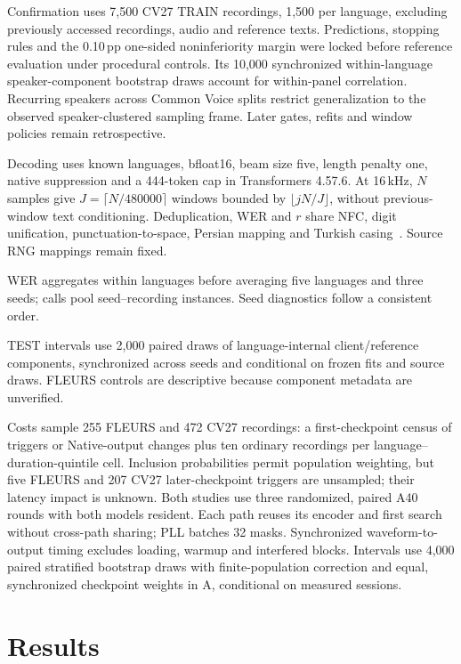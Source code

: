 \documentclass[conference,letterpaper]{IEEEtran}
\begin{document}
Confirmation uses 7,500 CV27 TRAIN recordings, 1,500 per language, excluding previously accessed recordings, audio and reference texts. Predictions, stopping rules and the 0.10\,pp one-sided noninferiority margin were locked before reference evaluation under procedural controls. Its 10,000 synchronized within-language speaker-component bootstrap draws account for within-panel correlation. Recurring speakers across Common Voice splits restrict generalization to the observed speaker-clustered sampling frame. Later gates, refits and window policies remain retrospective.

Decoding uses known languages, bfloat16, beam size five, length penalty one, native suppression and a 444-token cap in Transformers 4.57.6. At 16\,kHz, $N$ samples give $J=\lceil N/480000\rceil$ windows bounded by $\lfloor jN/J\rfloor$, without previous-window text conditioning. Deduplication, WER and $r$ share NFC, digit unification, punctuation-to-space, Persian mapping and Turkish casing~\cite{normalization}. Source RNG mappings remain fixed.

WER aggregates within languages before averaging five languages and three seeds; calls pool seed--recording instances. Seed diagnostics follow a consistent order.

\pagebreak[4]
TEST intervals use 2,000 paired draws of language-internal client/reference components, synchronized across seeds and conditional on frozen fits and source draws. FLEURS controls are descriptive because component metadata are unverified.

Costs sample 255 FLEURS and 472 CV27 recordings: a first-checkpoint census of triggers or Native-output changes plus ten ordinary recordings per language--duration-quintile cell. Inclusion probabilities permit population weighting, but five FLEURS and 207 CV27 later-checkpoint triggers are unsampled; their latency impact is unknown. Both studies use three randomized, paired A40 rounds with both models resident. Each path reuses its encoder and first search without cross-path sharing; PLL batches 32 masks. Synchronized waveform-to-output timing excludes loading, warmup and interfered blocks. Intervals use 4,000 paired stratified bootstrap draws with finite-population correction and equal, synchronized checkpoint weights in A, conditional on measured sessions.

\section{Results}

\end{document}
